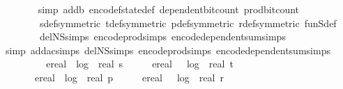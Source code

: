 \begin{isabellebody}
\ \ \ \ \ \ \isamarkupfalse%
\ {\isacharparenleft}{\kern0pt}simp\ add{\isacharcolon}{\kern0pt}b{\isacharunderscore}{\kern0pt}{}\ encode{\isacharunderscore}{\kern0pt}f{}{\isacharunderscore}{\kern0pt}state{\isacharunderscore}{\kern0pt}def\ dependent{\isacharunderscore}{\kern0pt}bit{\isacharunderscore}{\kern0pt}count\ prod{\isacharunderscore}{\kern0pt}bit{\isacharunderscore}{\kern0pt}count\isanewline
\ \ \ \ \ \ \ \ s{\isacharunderscore}{\kern0pt}def{\isacharbrackleft}{\kern0pt}symmetric{\isacharbrackright}{\kern0pt}\ t{\isacharunderscore}{\kern0pt}def{\isacharbrackleft}{\kern0pt}symmetric{\isacharbrackright}{\kern0pt}\ p{\isacharunderscore}{\kern0pt}def{\isacharbrackleft}{\kern0pt}symmetric{\isacharbrackright}{\kern0pt}\ r{\isacharunderscore}{\kern0pt}def{\isacharbrackleft}{\kern0pt}symmetric{\isacharbrackright}{\kern0pt}\ fun\isactrlsub S{\isacharunderscore}{\kern0pt}def\isanewline
\ \ \ \ \ \ \ \ del{\isacharcolon}{\kern0pt}N\isactrlsub S{\isachardot}{\kern0pt}simps\ encode{\isacharunderscore}{\kern0pt}prod{\isachardot}{\kern0pt}simps\ encode{\isacharunderscore}{\kern0pt}dependent{\isacharunderscore}{\kern0pt}sum{\isachardot}{\kern0pt}simps{\isacharparenright}{\kern0pt}\isanewline
\ \ \ \ \ \ \isamarkupfalse%
\ {\isacharparenleft}{\kern0pt}simp\ add{\isacharcolon}{\kern0pt}ac{\isacharunderscore}{\kern0pt}simps\ del{\isacharcolon}{\kern0pt}N\isactrlsub S{\isachardot}{\kern0pt}simps\ encode{\isacharunderscore}{\kern0pt}prod{\isachardot}{\kern0pt}simps\ encode{\isacharunderscore}{\kern0pt}dependent{\isacharunderscore}{\kern0pt}sum{\isachardot}{\kern0pt}simps{\isacharparenright}{\kern0pt}\isanewline
\ \ \ \ \isamarkupfalse%
\ \isamarkupfalse%
\ {\isachardoublequoteopen}{\isachardot}{\kern0pt}{\isachardot}{\kern0pt}{\isachardot}{\kern0pt}\ {\isasymle}\ ereal\ {\isacharparenleft}{\kern0pt}{}{\isacharasterisk}{\kern0pt}\ log\ {}\ {\isacharparenleft}{\kern0pt}real\ s\ {\isacharplus}{\kern0pt}\ {}{\isacharparenright}{\kern0pt}\ {\isacharplus}{\kern0pt}\ {}{\isacharparenright}{\kern0pt}\ {\isacharplus}{\kern0pt}\ ereal\ \ {\isacharparenleft}{\kern0pt}{}{\isacharasterisk}{\kern0pt}\ log\ {}\ {\isacharparenleft}{\kern0pt}real\ t\ {\isacharplus}{\kern0pt}\ {}{\isacharparenright}{\kern0pt}\ {\isacharplus}{\kern0pt}\ {}{\isacharparenright}{\kern0pt}\isanewline
\ \ \ \ \ \ {\isacharplus}{\kern0pt}\ ereal\ {\isacharparenleft}{\kern0pt}{}{\isacharasterisk}{\kern0pt}\ log\ {}\ {\isacharparenleft}{\kern0pt}real\ p\ {\isacharplus}{\kern0pt}\ {}{\isacharparenright}{\kern0pt}\ {\isacharplus}{\kern0pt}\ {}{\isacharparenright}{\kern0pt}\ {\isacharplus}{\kern0pt}\ ereal\ {\isacharparenleft}{\kern0pt}{}\ {\isacharasterisk}{\kern0pt}\ log\ {}\ {\isacharparenleft}{\kern0pt}real\ r\ {\isacharplus}{\kern0pt}\ {}{\isacharparenright}{\kern0pt}\ {\isacharplus}{\kern0pt}\ {}{\isacharparenright}{\kern0pt}\isanewline

\end{isabellebody}
